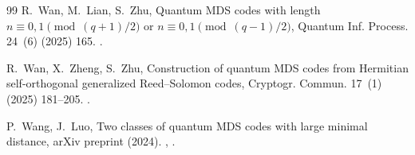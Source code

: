 \documentclass[preprint,12pt,a4paper]{elsarticle}
\begin{document}
\begin{thebibliography}{99}
R.~Wan, M.~Lian, S.~Zhu, Quantum {MDS} codes with length $n\equiv
  0,1\pmod{(q+1)/2}$ or $n\equiv 0,1\pmod{(q-1)/2}$, Quantum Inf. Process. 24~(6) (2025) 165.
\newblock \href {https://doi.org/10.1007/s11128-025-04788-5}
  {}.

R.~Wan, X.~Zheng, S.~Zhu, Construction of quantum {MDS} codes from {Hermitian}
  self-orthogonal generalized {Reed--Solomon} codes, Cryptogr. Commun. 17~(1) (2025) 181--205.
\newblock \href {https://doi.org/10.1007/s12095-024-00752-9}
  {}.

P.~Wang, J.~Luo, Two classes of quantum {MDS} codes with large minimal distance,
  arXiv preprint (2024).
\newblock \href {https://arxiv.org/abs/2410.17280} {},
  \href {https://doi.org/10.48550/arXiv.2410.17280}
  {}.

\end{thebibliography}
\end{document}
